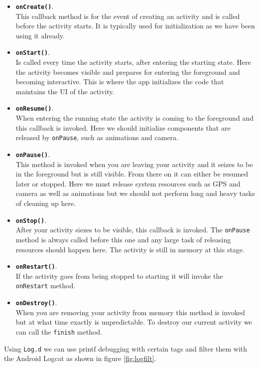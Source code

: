 \begin{itemize}
	\item \textbf{\texttt{onCreate()}}.\\
    \noindent This callback method is for the event of creating an activity and is called before the activity starts. It is typically used for initialization as we have been using it already.
	\item \textbf{\texttt{onStart()}}.\\
    \noindent Is called every time the activity starts, after entering the starting state. Here the activity becomes visible and prepares for entering the foreground and becoming interactive. This is where the app initializes the code that maintains the UI of the activity.
	\item \textbf{\texttt{onResume()}}.\\
    \noindent When entering the running state the activity is coming to the foreground and this callback is invoked. Here we should initialize components that are released by \texttt{onPause}, such as animations and camera.
	\item \textbf{\texttt{onPause()}}.\\
    \noindent This method is invoked when you are leaving your activity and it seizes to be in the foreground but is still visible. From there on it can either be resumed later or stopped. Here we must release system resources such as GPS and camera as well as animations but we should not perform long and heavy tasks of cleaning up here.
	\item \textbf{\texttt{onStop()}}.\\
    \noindent After your activity siezes to be visible, this callback is invoked. The \texttt{onPause} method is always called before this one and any large task of releasing resources should happen here. The activity is still in memory at this stage.
	\item \textbf{\texttt{onRestart()}}.\\
    \noindent If the activity goes from being stopped to starting it will invoke the \texttt{onRestart} method.
	\item \textbf{\texttt{onDestroy()}}.\\
    \noindent When you are removing your activity from memory this method is invoked but at what time exactly is unpredictable. To destroy our current activity we can call the \texttt{finish} method.
\end{itemize}

Using \texttt{Log.d} we can use printf debugging with certain tags and filter them with the Android Logcat as shown in figure \ref{fig:logfilt}. 

